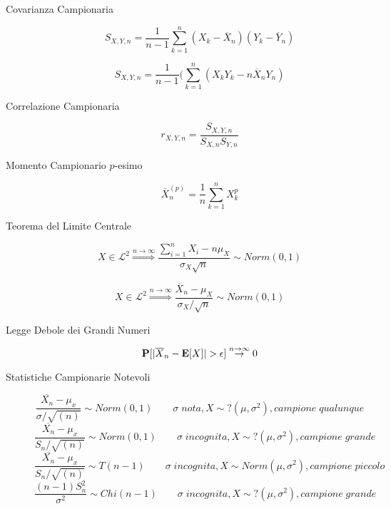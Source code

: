 \begin{description}
	\item[Covarianza Campionaria]
	\begin{equation}
	S_{X,Y,n}=\frac{1}{n-1}\sum_{k=1}^{n}(X_{k}-\overline{X}_{n})(Y_{k}-\overline{Y}_{n})
	\end{equation}
	
	\begin{equation}
	S_{X,Y,n}=\frac{1}{n-1}(\sum_{k=1}^{n}(X_{k}Y_{k}-n\overline{X}_{n}Y_{n})
	\end{equation}
	
	\item[Correlazione Campionaria]
	\begin{equation}
	r_{X,Y,n} = \frac{S_{X,Y,n}}{S_{X,n}S_{Y,n}}
	\end{equation}
	
	\item[Momento Campionario $p$-esimo]
	\begin{equation}
	\overline{X}_{n}^{(p)} = \frac{1}{n}\sum_{k=1}^{n}X_{k}^{p}
	\end{equation}
	
	\item[Teorema del Limite Centrale]
	\begin{equation}
	X\in\mathcal{L}^{2}
	\overset{n\rightarrow\infty}{\Rightarrow}
	\frac{\sum_{i=1}^{n} X_{i}-n\mu_{X}}{\sigma_{X}\sqrt{n}} \sim Norm(0,1)
	\end{equation}
	
	\begin{equation}
	X\in\mathcal{L}^{2}
	\overset{n\rightarrow\infty}{\Rightarrow}
	\frac{\overline{X}_{n}-\mu_{X}}{\sigma_{X}/\sqrt{n}} \sim Norm(0,1)
	\end{equation}
	
	\item[Legge Debole dei Grandi Numeri]
	\begin{equation}
	\mathbf{P}[|\overline{X}_{n}-\mathbf{E}[X]| > \epsilon] \overset{n\rightarrow\infty}{\rightarrow}0
	\end{equation}
	
	\item[Statistiche Campionarie Notevoli]
	\begin{equation}
	\frac{\overline{X_{n}}-\mu_{x}}{\sigma / \sqrt{(n)}} \sim Norm(0,1)
	\qquad
	\sigma\;nota,X\sim?(\mu,\sigma^{2}),campione\;qualunque
	\end{equation}
	\begin{equation}
	\frac{\overline{X_{n}}-\mu_{x}}{S_{n}/\sqrt{(n)}} \sim Norm(0,1)
	\qquad
	\sigma\;incognita,X\sim?(\mu,\sigma^{2}),campione\;grande
	\end{equation}
	\begin{equation}
	\frac{\overline{X_{n}}-\mu_{x}}{S_{n}/\sqrt{(n)}} \sim T(n-1)
	\qquad
	\sigma\;incognita,X\sim Norm(\mu,\sigma^{2}),campione\;piccolo
	\end{equation}
	\begin{equation}
	\frac{(n-1)S_{n}^{2}}{\sigma^{2}} \sim Chi(n-1)
	\qquad
	\sigma\;incognita,X\sim ?(\mu,\sigma^{2}),campione\;grande
	\end{equation}	
\end{description}
\newpage

